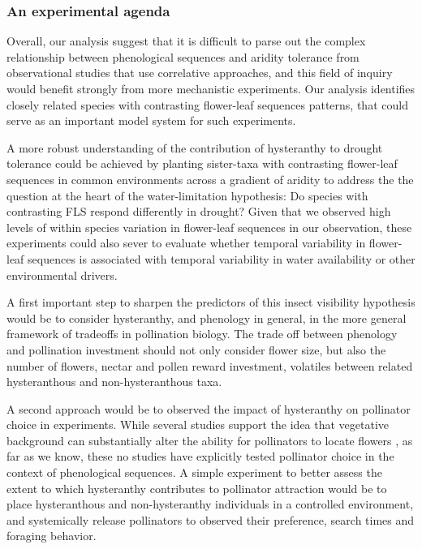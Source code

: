 \documentclass{article}[11pt]
\begin{document}



 \subsubsection*{An experimental agenda} 

Overall, our analysis suggest that it is difficult to parse out the complex relationship between phenological sequences and aridity tolerance from observational studies that use correlative approaches, and this field of inquiry would benefit strongly from more mechanistic experiments. Our analysis identifies closely related species with contrasting flower-leaf sequences patterns, that could serve as an important model system for such experiments. 

A more robust understanding of the contribution of hysteranthy to drought tolerance could be achieved by planting sister-taxa with contrasting flower-leaf sequences in common environments across a gradient of aridity to address the the question at the heart of the water-limitation hypothesis: Do species with contrasting FLS respond differently in drought? Given that we observed high levels of within species variation in flower-leaf sequences in our observation, these experiments could also sever to evaluate whether temporal variability in flower-leaf sequences is associated with temporal variability in water availability or other environmental drivers.


A first important step to sharpen the predictors of this insect visibility hypothesis would be to consider hysteranthy, and phenology in general, in the more general framework of tradeoffs in pollination biology. The trade off between phenology and pollination investment should not only consider flower size, but also the number of flowers, nectar and pollen reward investment, volatiles between related hysteranthous and non-hysteranthous taxa. 

A second approach would be to observed the impact of hysteranthy on pollinator choice in experiments. While several studies support the idea that vegetative background can substantially alter the ability for pollinators to locate flowers \citep{Forrest:2009aa,Rivest:2017aa,Spaethe3898}, as far as we know, these no studies have explicitly tested pollinator choice in the context of phenological sequences. A simple experiment to better assess the extent to which hysteranthy contributes to pollinator attraction would be to place hysteranthous and non-hysteranthy individuals in a controlled environment, and systemically release pollinators to observed their preference, search times and foraging behavior.
\end{document}
